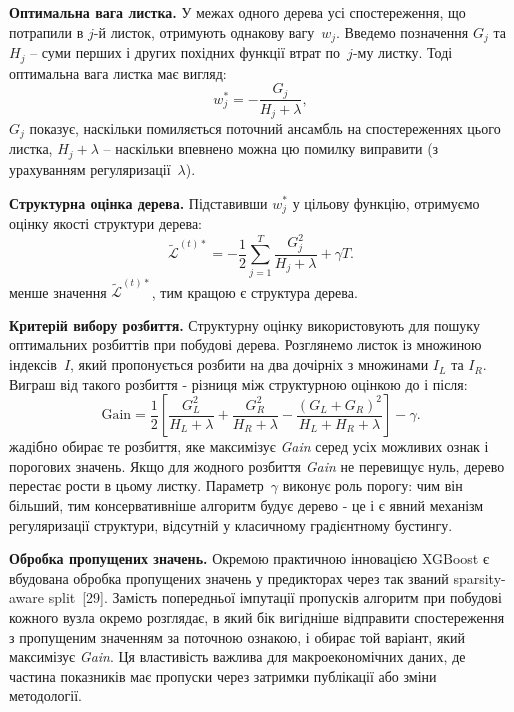 \documentclass{bachelor_thesis}
\begin{document}
\textbf{Оптимальна вага листка.} У межах одного дерева усі спостереження, що потрапили в $j$-й листок, отримують однакову вагу~$w_j$. Введемо позначення $G_j$ та $H_j$ -- суми перших і других похідних функції втрат по~$j$-му листку. Тоді оптимальна вага листка має вигляд:
\begin{equation*}
w_j^* = -\frac{G_j}{H_j + \lambda},
\end{equation*}
\noindent$G_j$ показує, наскільки помиляється поточний ансамбль на спостереженнях цього листка, $H_j + \lambda$ -- наскільки впевнено можна цю помилку виправити (з урахуванням регуляризації~$\lambda$).

\textbf{Структурна оцінка дерева.} Підставивши $w_j^*$ у цільову функцію, отримуємо оцінку якості структури дерева:
\begin{equation*}
\tilde{\mathcal{L}}^{(t)*} = -\frac{1}{2} \sum_{j=1}^{T} \frac{G_j^2}{H_j + \lambda} + \gamma T.
\end{equation*}
 менше значення $\tilde{\mathcal{L}}^{(t)*}$, тим кращою є структура дерева.

\textbf{Критерій вибору розбиття.} Структурну оцінку використовують для пошуку оптимальних розбиттів при побудові дерева. Розглянемо листок із множиною індексів~$I$, який пропонується розбити на два дочірніх з множинами $I_L$ та $I_R$. Виграш від такого розбиття - різниця між структурною оцінкою до і після:
\begin{equation*}
\mathrm{Gain} = \frac{1}{2} \left[ \frac{G_L^2}{H_L + \lambda} + \frac{G_R^2}{H_R + \lambda} - \frac{(G_L + G_R)^2}{H_L + H_R + \lambda} \right] - \gamma.
\end{equation*}
 жадібно обирає те розбиття, яке максимізує \textit{Gain} серед усіх можливих ознак і порогових значень. Якщо для жодного розбиття \textit{Gain} не перевищує нуль, дерево перестає рости в цьому листку. Параметр~$\gamma$ виконує роль порогу: чим він більший, тим консервативніше алгоритм будує дерево - це і є явний механізм регуляризації структури, відсутній у класичному градієнтному бустингу.

\textbf{Обробка пропущених значень.} Окремою практичною інновацією XGBoost є вбудована обробка пропущених значень у предикторах через так званий sparsity-aware split~[29]. Замість попередньої імпутації пропусків алгоритм при побудові кожного вузла окремо розглядає, в який бік вигідніше відправити спостереження з пропущеним значенням за поточною ознакою, і обирає той варіант, який максимізує \textit{Gain}. Ця властивість важлива для макроекономічних даних, де частина показників має пропуски через затримки публікації або зміни методології.
\end{document}
